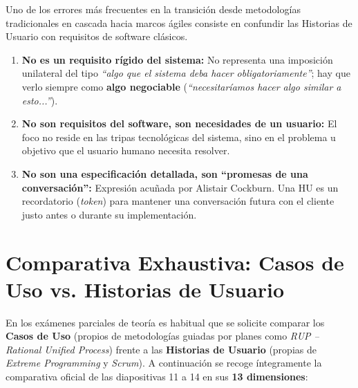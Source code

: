 Uno de los errores más frecuentes en la transición desde metodologías tradicionales en cascada hacia marcos ágiles consiste en confundir las Historias de Usuario con requisitos de software clásicos.

\begin{teorema}
\begin{enumerate}[label=\textbf{\arabic*.}, itemsep=4pt]
    \item \textbf{No es un requisito rígido del sistema:} No representa una imposición unilateral del tipo \textit{``algo que el sistema deba hacer obligatoriamente''}; hay que verlo siempre como \textbf{algo negociable} (\textit{``necesitaríamos hacer algo similar a esto...''}).
    \item \textbf{No son requisitos del software, son necesidades de un usuario:} El foco no reside en las tripas tecnológicas del sistema, sino en el problema u objetivo que el usuario humano necesita resolver.
    \item \textbf{No son una especificación detallada, son ``promesas de una conversación'':} Expresión acuñada por Alistair Cockburn. Una HU es un recordatorio (\textit{token}) para mantener una conversación futura con el cliente justo antes o durante su implementación.
\end{enumerate}
\end{teorema}

\section{Comparativa Exhaustiva: Casos de Uso vs. Historias de Usuario}

En los exámenes parciales de teoría es habitual que se solicite comparar los \textbf{Casos de Uso} (propios de metodologías guiadas por planes como \textit{RUP -- Rational Unified Process}) frente a las \textbf{Historias de Usuario} (propias de \textit{Extreme Programming} y \textit{Scrum}). A continuación se recoge íntegramente la comparativa oficial de las diapositivas 11 a 14 en sus \textbf{13 dimensiones}:

